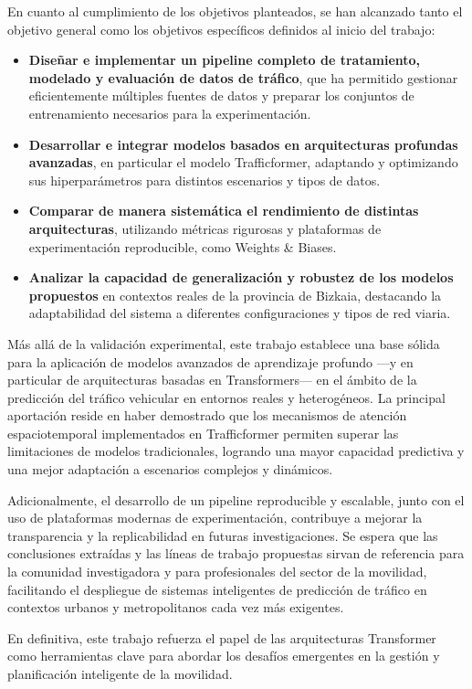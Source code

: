 En cuanto al cumplimiento de los objetivos planteados, se han alcanzado tanto el objetivo general como los objetivos específicos definidos al inicio del trabajo:
\begin{itemize}
	\item \textbf{Diseñar e implementar un pipeline completo de tratamiento, modelado y evaluación de datos de tráfico}, que ha permitido gestionar eficientemente múltiples fuentes de datos y preparar los conjuntos de entrenamiento necesarios para la experimentación.
	\item \textbf{Desarrollar e integrar modelos basados en arquitecturas profundas avanzadas}, en particular el modelo Trafficformer, adaptando y optimizando sus hiperparámetros para distintos escenarios y tipos de datos.
	\item \textbf{Comparar de manera sistemática el rendimiento de distintas arquitecturas}, utilizando métricas rigurosas y plataformas de experimentación reproducible, como Weights \& Biases.
	\item \textbf{Analizar la capacidad de generalización y robustez de los modelos propuestos} en contextos reales de la provincia de Bizkaia, destacando la adaptabilidad del sistema a diferentes configuraciones y tipos de red viaria.
\end{itemize}

Más allá de la validación experimental, este trabajo establece una base sólida para la aplicación de modelos avanzados de aprendizaje profundo —y en particular de arquitecturas basadas en Transformers— en el ámbito de la predicción del tráfico vehicular en entornos reales y heterogéneos. La principal aportación reside en haber demostrado que los mecanismos de atención espaciotemporal implementados en Trafficformer permiten superar las limitaciones de modelos tradicionales, logrando una mayor capacidad predictiva y una mejor adaptación a escenarios complejos y dinámicos.

Adicionalmente, el desarrollo de un pipeline reproducible y escalable, junto con el uso de plataformas modernas de experimentación, contribuye a mejorar la transparencia y la replicabilidad en futuras investigaciones. Se espera que las conclusiones extraídas y las líneas de trabajo propuestas sirvan de referencia para la comunidad investigadora y para profesionales del sector de la movilidad, facilitando el despliegue de sistemas inteligentes de predicción de tráfico en contextos urbanos y metropolitanos cada vez más exigentes.

En definitiva, este trabajo refuerza el papel de las arquitecturas Transformer como herramientas clave para abordar los desafíos emergentes en la gestión y planificación inteligente de la movilidad.

